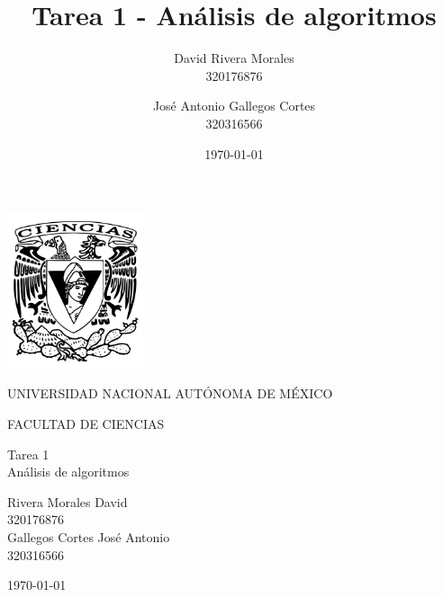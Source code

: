 \documentclass[12pt]{article}
\title{Tarea 1 - Análisis de algoritmos}
\author{David Rivera Morales \\ 320176876 \and José Antonio Gallegos Cortes \\ 320316566}
\date{\today}
\begin{document}
\begin{titlepage}
\begin{center}

\includegraphics[width=0.3\textwidth]{images/escudo-unam.png}

\vspace{1cm}
{\Large UNIVERSIDAD NACIONAL AUTÓNOMA DE MÉXICO}

\vspace{1.5cm}
{\Large FACULTAD DE CIENCIAS}

\vspace{3cm}
{\Large Tarea 1}\\
\vspace{0.5cm}
{\Large Análisis de algoritmos}

\vspace{2cm}
\vspace{0.5cm}
{\large Rivera Morales David}\\
{\large 320176876}\\
\vspace{0.5cm}
{\large Gallegos Cortes José Antonio}\\
{\large 320316566}

\vfill
{\large \today}
\end{center}
\end{titlepage}






\end{document}
